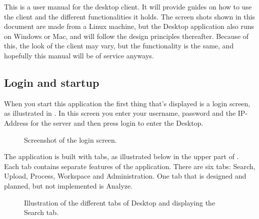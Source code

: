 
This is a user manual for the desktop client. It will provide guides on how to use the client and the different functionalities it holds. The screen shots shown in this document are made from a Linux machine, but the Desktop application also runs on Windows or Mac, and will follow the design principles thereafter. Because of this, the look of the client may vary, but the functionality is the same, and hopefully this manual will be of service anyways.

\subsection{Login and startup}
When you start this application the first thing that's displayed is a login screen, as illustrated in . In this screen you enter your username, password and the IP-Address for the server and then press login to enter the \appName Desktop.

\begin{figure}[htb]
	\caption{Screenshot of the login screen.}
	\label{fig:des_login-pic}
\end{figure}
The application is built with tabs, as illustrated below in the upper part of . Each tab contains separate features of the application. There are six tabs: Search, Upload, Process, Workspace and Administration. One tab that is designed and planned, but not implemented is Analyze.
\begin{figure}[htb]
	\caption{Illustration of the different tabs of \appName Desktop and displaying the Search tab.}
	\label{fig:des_tabs-view}
\end{figure}
\FloatBarrier

